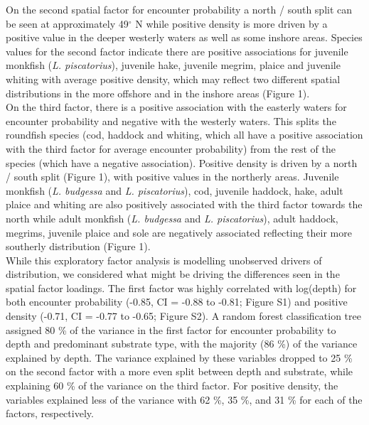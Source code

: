 \documentclass[fleqn,10pt]{wlscirep}
\begin{document}
\begin{linenumbers}
On the second spatial factor for encounter probability a north / south split
can be seen at approximately 49$^{\circ}$ N while positive density is more
driven by a positive value in the deeper westerly waters as well as some
inshore areas. Species values for the second factor indicate there are
positive associations for juvenile monkfish (\emph{L. piscatorius}), juvenile
hake, juvenile megrim, plaice and juvenile whiting with average positive
density, which may reflect two different spatial distributions in the more
offshore and in the inshore areas (Figure 1).\\

On the third factor, there is a positive association with the easterly waters
for encounter probability and negative with the westerly waters. This splits
the roundfish species (cod, haddock and whiting, which all have a positive
association with the third factor for average encounter probability) from the
rest of the species (which have a negative association). Positive
density is driven by a north / south split (Figure 1), with positive values in
the northerly areas. Juvenile monkfish (\emph{L.  budgessa} and \emph{L.
	piscatorius}), cod, juvenile haddock, hake, adult plaice and whiting
are also positively associated with the third factor towards the north while
adult monkfish (\emph{L. budgessa} and \emph{L.  piscatorius}), adult haddock,
megrims, juvenile plaice and sole are negatively associated reflecting their
more southerly distribution (Figure 1).\\

While this exploratory factor analysis is modelling unobserved drivers of
distribution, we considered what might be driving the differences seen in the
spatial factor loadings. The first factor was highly correlated with log(depth)
for both encounter probability (-0.85, CI = -0.88 to -0.81; Figure S1) and
positive density (-0.71, CI = -0.77 to -0.65; Figure S2). A random forest
classification tree assigned 80 \% of the variance in the first factor for
encounter probability to depth and predominant substrate type, with the
majority (86 \%) of the variance explained by depth. The variance explained by
these variables dropped to 25 \% on the second factor with a more even split
between depth and substrate, while explaining 60 \% of the variance on the
third factor.  For positive density, the variables explained less of the
variance with 62 \%, 35 \%, and 31 \% for each of the factors, respectively.\\


\end{linenumbers}
\end{document}
